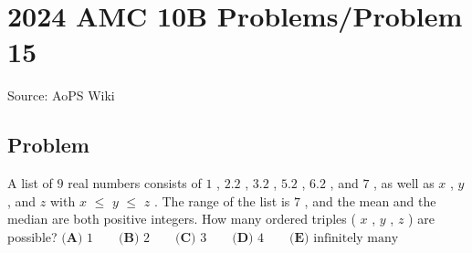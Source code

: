 \documentclass[12pt]{article}
\begin{document}
\section*{{2024 AMC 10B Problems/Problem 15}}
Source: AoPS Wiki

\subsection*{Problem}
A list of $9$ real numbers consists of $1$ , $2.2$ , $3.2$ , $5.2$ , $6.2$ , and $7$ , as well as $x$ , $y$ , and $z$ with $x$ $\le$ $y$ $\le$ $z$ . The range of the list is $7$ , and the mean and the median are both positive integers. How many ordered triples ( $x$ , $y$ , $z$ ) are possible? $\textbf{(A) } 1 \qquad \textbf{(B) } 2 \qquad \textbf{(C) } 3 \qquad \textbf{(D) } 4 \qquad \textbf{(E) } \text{infinitely many}$
\end{document}
